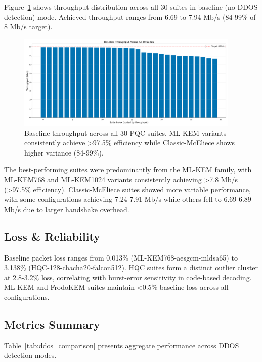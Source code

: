 \documentclass[11pt,a4paper]{article}
\begin{document}
Figure~\ref{fig:throughput_baseline} shows throughput distribution across all 30 suites in baseline (no DDOS detection) mode. Achieved throughput ranges from 6.69 to 7.94 Mb/s (84-99\% of 8 Mb/s target).

\begin{figure}[H]
\centering
\includegraphics[width=0.95\textwidth]{../figures/figure01_throughput_all_suites_baseline.png}
\caption{Baseline throughput across all 30 PQC suites. ML-KEM variants consistently achieve >97.5\% efficiency while Classic-McEliece shows higher variance (84-99\%).}
\label{fig:throughput_baseline}
\end{figure}

The best-performing suites were predominantly from the ML-KEM family, with ML-KEM768 and ML-KEM1024 variants consistently achieving >7.8 Mb/s (>97.5\% efficiency). Classic-McEliece suites showed more variable performance, with some configurations achieving 7.24-7.91 Mb/s while others fell to 6.69-6.89 Mb/s due to larger handshake overhead.

\subsection{Loss \& Reliability}

Baseline packet loss ranges from 0.013\% (ML-KEM768-aesgcm-mldsa65) to 3.138\% (HQC-128-chacha20-falcon512). HQC suites form a distinct outlier cluster at 2.8-3.2\% loss, correlating with burst-error sensitivity in code-based decoding. ML-KEM and FrodoKEM suites maintain <0.5\% baseline loss across all configurations.

\subsection{Metrics Summary}

Table~\ref{tab:ddos_comparison} presents aggregate performance across DDOS detection modes.


\end{document}

